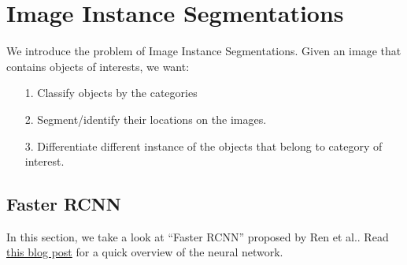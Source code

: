 \documentclass[]{article}
\theoremstyle{definition}
\numberwithin{equation}{subsection}
\begin{document}
\section{Image Instance Segmentations}
    We introduce the problem of Image Instance Segmentations. 
    Given an image that contains objects of interests, we want: 
    \begin{enumerate}
        \item [1.] Classify objects by the categories 
        \item [2.] Segment/identify their locations on the images. 
        \item [3.] Differentiate different instance of the objects that belong to category of interest. 
    \end{enumerate}

    \subsection{Faster RCNN}
        In this section, we take a look at ``Faster RCNN'' proposed by Ren et al.\cite{ren_faster_2016}. 
        Read \href{https://www.neuralception.com/objectdetection-fasterrcnn/}{this blog post} for a quick overview of the neural network. 
\end{document}
